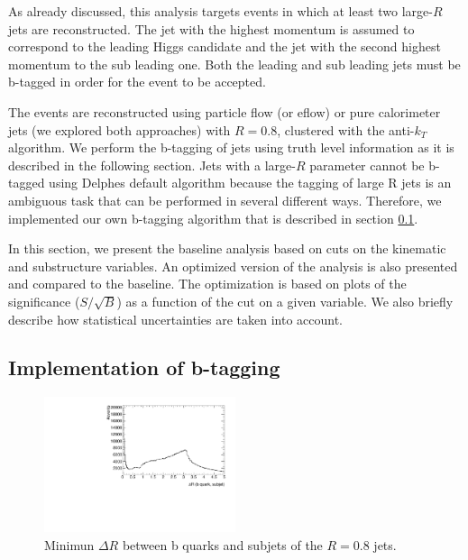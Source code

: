 As already discussed, this analysis targets events in which at least two large-$R$ jets are reconstructed. The jet with the highest momentum is assumed to correspond to the leading Higgs candidate and the jet with the second highest momentum to the sub leading one. Both the leading and sub leading jets must be b-tagged in order for the event to be accepted.

The events are reconstructed using particle flow (or eflow) or pure calorimeter jets (we explored both approaches) with $R=0.8$, clustered with the anti-$k_T$ algorithm. We perform the b-tagging of jets using truth level information as it is described in the following section. Jets with a large-$R$ parameter cannot be b-tagged using Delphes default algorithm because the tagging of large R jets is an ambiguous task that can be performed in several different ways. Therefore, we implemented our own b-tagging algorithm that is described in section \ref{sec:btagging}. 

In this section, we present the baseline analysis based on cuts on the kinematic and substructure variables. An optimized version of the analysis is also presented and compared to the baseline. The optimization is based on plots of the significance ($S/\sqrt{B}$) as a function of the cut on a given variable. We also briefly describe how statistical uncertainties are taken into account. 

\subsection{Implementation of b-tagging}
\label{sec:btagging}

\begin{figure}
	\centering
	\includegraphics[width=0.5\textwidth]{./Figures/deltaR_bsubjet}
	\caption{Minimun $\Delta R$ between b quarks and subjets of the $R=0.8$ jets.} 
	\label{fig:deltaR_bsubjet}
\end{figure}


